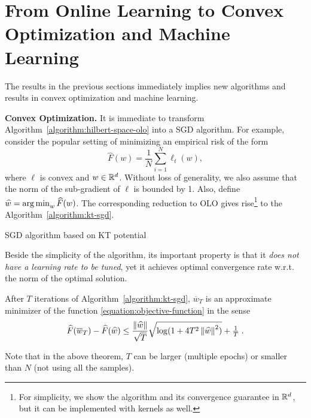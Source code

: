 \section{From Online Learning to Convex Optimization and Machine Learning}
\label{section:applications}

The results in the previous sections immediately implies new algorithms and
results in convex optimization and machine learning.

\textbf{Convex Optimization.} It is immediate to transform
Algorithm~\ref{algorithm:hilbert-space-olo} into a \ac{SGD} algorithm.  For
example, consider the popular setting of minimizing an empirical risk of the
form
\begin{equation}
\label{equation:objective-function}
\widehat{F}(w) = \frac{1}{N} \sum_{i=1}^N \ell_t(w),
\end{equation}
where $\ell$ is convex and $w \in \mathbb{R}^d$. Without loss of generality, we also
assume that the norm of the sub-gradient of $\ell$ is bounded by 1. Also,
define $\widehat{w}=  \operatorname*{arg\,min}_w \widehat{F}(w)$.  The corresponding reduction to OLO
gives rise\footnote{For simplicity, we show the algorithm and its convergence
guarantee in $\mathbb{R}^d$, but it can be implemented with kernels as well.} to the
Algorithm~\ref{algorithm:kt-sgd}.

\begin{algorithm}[h]
\caption{SGD algorithm based on KT potential \label{algorithm:kt-sgd}}
\begin{algorithmic}
{
\ENDFOR
{}
}
\end{algorithmic}
\end{algorithm}

Beside the simplicity of the algorithm, its important property is that it
\emph{does not have a learning rate to be tuned}, yet it achieves optimal
convergence rate w.r.t. the norm of the optimal solution.

\begin{theorem}
After $T$ iterations of Algorithm~\ref{algorithm:kt-sgd}, $\overline{w}_T$ is
an approximate minimizer of the function \eqref{equation:objective-function} in
the sense
$$
\widehat{F}(\overline{w}_T) - \widehat{F}(\widehat{w}) \leq \frac{\left\|{\widehat{w}}\right\|}{\sqrt{T}} \sqrt{\log(1+4 T^2 \left\|{\widehat{w}}\right\|^2)} +\tfrac{1}{T} \; .
$$
\end{theorem}
Note that in the above theorem, $T$ can be larger (multiple epochs) or smaller
than $N$ (not using all the samples).

